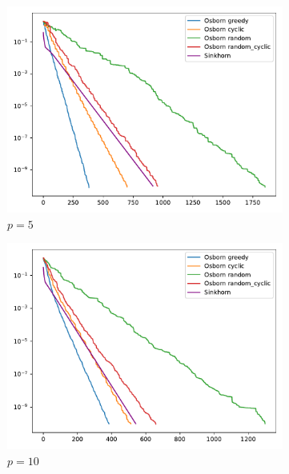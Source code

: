 \begin{figure}[H]
\begin{subfigure}[b]{.18\textwidth}
        \centering
        \includegraphics[width=\textwidth]{figures/minkowski/osborn_vs_sinkhorn_dist2_0.01_1e-10_5_5}
        \caption{\(p = 5\)}
    \end{subfigure}
    \hfill
    \begin{subfigure}[b]{.18\textwidth}
        \centering
        \includegraphics[width=\textwidth]{figures/minkowski/osborn_vs_sinkhorn_dist2_0.01_1e-10_10_10}
        \caption{\(p = 10\)}
    \end{subfigure}
    \hfill
    \begin{subfigure}[b]{.18\textwidth}
        \centering

\end{subfigure}
\end{figure}
